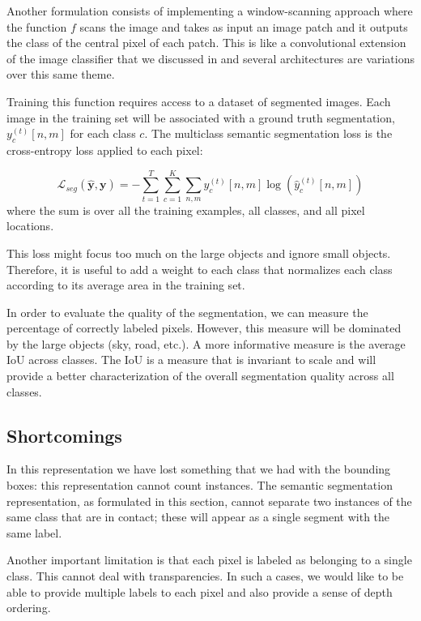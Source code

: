Another formulation consists of implementing a window-scanning approach where the function $f$ scans the image and takes as input an image patch and it outputs the class of the central pixel of each patch. This is like a convolutional extension of the image classifier that we discussed in \sect{\ref{sec:image_classification}} and several architectures are variations over this same theme.

Training this function requires access to a dataset of segmented images. Each image in the training set will be associated with a ground truth segmentation, $y^{(t)}_c \left[n,m \right]$ for each class $c$. The multiclass semantic segmentation loss is the cross-entropy loss applied to each pixel:

\begin{equation}
    \mathcal{L}_{seg}(\hat{\mathbf{y}},\mathbf{y})
    = -\sum_{t=1}^{T} \sum_{c=1}^{K} \sum_{n,m}  y^{(t)}_c \left[n,m \right] \log(\hat{y}^{(t)}_c \left[n,m \right])
\end{equation}
where the sum is over all the training examples, all classes, and all pixel locations.

This loss might focus too much on the large objects and ignore small objects. Therefore, it is useful to add a weight to each class that normalizes each class according to its average area in the training set.

In order to evaluate the quality of the segmentation, we can measure the percentage of correctly labeled pixels. However, this measure will be dominated by the large objects (sky, road, etc.). A more informative measure is the average IoU across classes. The IoU is a measure that is invariant to scale and will provide a better characterization of the overall segmentation quality across all classes.

\subsection{Shortcomings}

In this representation we have lost something that we had with the bounding boxes: this representation cannot count instances. The semantic segmentation representation, as formulated in this section, cannot separate two instances of the same class that are in contact; these will appear as a single segment with the same label.

Another important limitation is that each pixel is labeled as belonging to a single class. This cannot deal with transparencies. In such a cases, we would like to be able to provide multiple labels to each pixel and also provide a sense of depth ordering.


